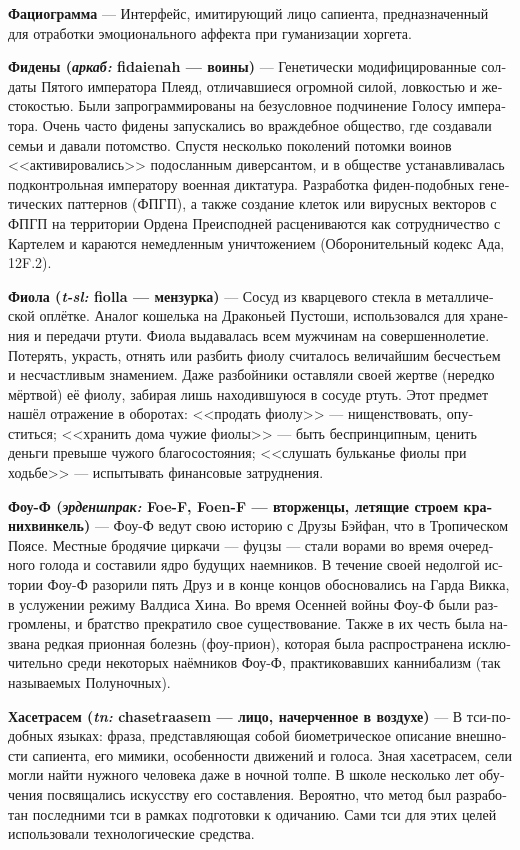 \documentclass[a4paper,12pt,fleqn]{book}\usepackage{polyglossia}\setdefaultlanguage[babelshorthands=true]{russian}\setotherlanguage{english}\defaultfontfeatures{Ligatures=TeX,Mapping=tex-text}\usepackage{xcolor}\newcommand{\ml}[3]{#2}
\newcommand{\theterm}[3]{\textbf{\hypertarget{#1}{#2}} --- #3}
\newcommand{\theorigin}[3]{\textit{#1:} #2 --- #3}
\begin{document}
{\theterm{faciogramm}
{Фациограмма}
{Интерфейс, имитирующий лицо сапиента, предназначенный для отработки эмоционального аффекта при гуманизации хоргета.}

\theterm{fidens}
{Фидены (\theorigin{аркаб}{fidaienah}{воины})}
{Генетически модифицированные солдаты Пятого императора Плеяд, отличавшиеся огромной силой, ловкостью и жестокостью.
Были запрограммированы на безусловное подчинение Голосу императора.
Очень часто фидены запускались во враждебное общество, где создавали семьи и давали потомство.
Спустя несколько поколений потомки воинов <<активировались>> подосланным диверсантом, и в обществе устанавливалась подконтрольная императору военная диктатура.
Разработка фиден-подобных генетических паттернов (ФПГП), а также создание клеток или вирусных векторов с ФПГП на территории Ордена Преисподней расцениваются как сотрудничество с Картелем и караются немедленным уничтожением (Оборонительный кодекс Ада, 12F.2).}

\theterm{viola}
{Фиола (\theorigin{t-sl}{fiolla}{мензурка})}
{Сосуд из кварцевого стекла в металлической оплётке.
Аналог кошелька на Драконьей Пустоши, использовался для хранения и передачи ртути.
Фиола выдавалась всем мужчинам на совершеннолетие.
Потерять, украсть, отнять или разбить фиолу считалось величайшим бесчестьем и несчастливым знамением.
Даже разбойники оставляли своей жертве (нередко мёртвой) её фиолу, забирая лишь находившуюся в сосуде ртуть.
Этот предмет нашёл отражение в оборотах: <<продать фиолу>> --- нищенствовать, опуститься;
<<хранить дома чужие фиолы>> --- быть беспринципным, ценить деньги превыше чужого благосостояния;
<<слушать бульканье фиолы при ходьбе>> --- испытывать финансовые затруднения.}

\theterm{foe-f}
{Фоу-Ф (\theorigin{эрденшпрак}{Foe-F, Foen-F}{вторженцы, летящие строем кранихвинкель})}
{Фоу-Ф ведут свою историю с Друзы Бэйфан, что в Тропическом Поясе.
Местные бродячие циркачи --- фуцзы --- стали ворами во время очередного голода и составили ядро будущих наемников.
В течение своей недолгой истории Фоу-Ф разорили пять Друз и в конце концов обосновались на Гарда Викка, в услужении режиму Валдиса Хина.
Во время Осенней войны Фоу-Ф были разгромлены, и братство прекратило свое существование.
Также в их честь была названа редкая прионная болезнь (фоу-прион), которая была распространена исключительно среди некоторых наёмников Фоу-Ф, практиковавших каннибализм (так называемых Полуночных).
}

\theterm{chasetraasem}
{Хасетрасем (\theorigin{tn}{chasetraasem}{лицо, начерченное в воздухе})}
{В тси-подобных языках: фраза, представляющая собой биометрическое описание внешности сапиента, его мимики, особенности движений и голоса.
Зная хасетрасем, сели могли найти нужного человека даже в ночной толпе.
В школе несколько лет обучения посвящались искусству его составления.
Вероятно, что метод был разработан последними тси в рамках подготовки к одичанию.
Сами тси для этих целей использовали технологические средства.}

}
\end{document}
